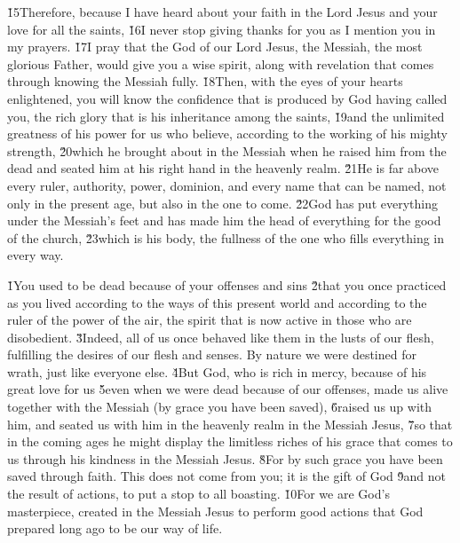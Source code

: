 \v{15}Therefore, because I have heard about your faith in the Lord Jesus and your love for all the saints, \v{16}I never stop giving thanks for you as I mention you in my prayers. \v{17}I pray that the God of our Lord Jesus, the Messiah, the most glorious Father, would give you a wise spirit, along with revelation that comes through knowing the Messiah fully. \v{18}Then, with the eyes of your hearts enlightened, you will know the confidence that is produced by God having called you, the rich glory that is his inheritance among the saints, \v{19}and the unlimited greatness of his power for us who believe, according to the working of his mighty strength, \v{20}which he brought about in the Messiah when he raised him from the dead and seated him at his right hand in the heavenly realm. \v{21}He is far above every ruler, authority, power, dominion, and every name that can be named, not only in the present age, but also in the one to come. \v{22}God has put everything under the Messiah's feet and has made him the head of everything for the good of the church, \v{23}which is his body, the fullness of the one who fills everything in every way.

\v{1}You used to be dead because of your offenses and sins \v{2}that you once practiced as you lived according to the ways of this present world and according to the ruler of the power of the air, the spirit that is now active in those who are disobedient. \v{3}Indeed, all of us once behaved like them in the lusts of our flesh, fulfilling the desires of our flesh and senses. By nature we were destined for wrath, just like everyone else. \v{4}But God, who is rich in mercy, because of his great love for us \v{5}even when we were dead because of our offenses, made us alive together with the Messiah (by grace you have been saved), \v{6}raised us up with him, and seated us with him in the heavenly realm in the Messiah Jesus, \v{7}so that in the coming ages he might display the limitless riches of his grace that comes to us through his kindness in the Messiah Jesus. \v{8}For by such grace you have been saved through faith. This does not come from you; it is the gift of God \v{9}and not the result of actions, to put a stop to all boasting. \v{10}For we are God's masterpiece, created in the Messiah Jesus to perform good actions that God prepared long ago to be our way of life.

